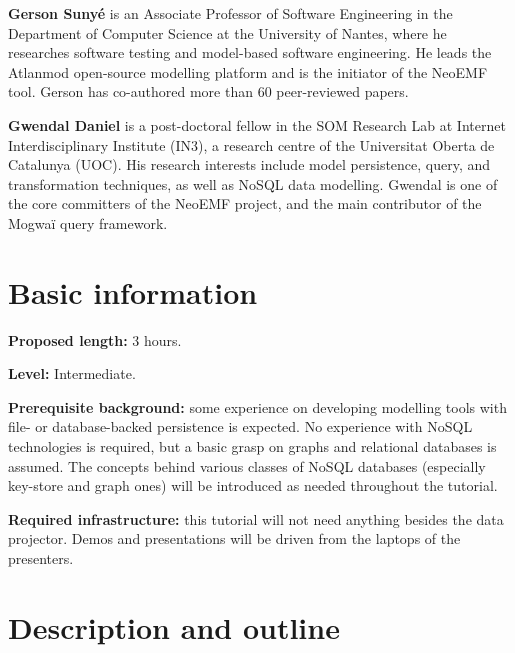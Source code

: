 \documentclass[conference]{IEEEtran}
\newcommand{\todo}[1]{{\color{red}#1}}
\begin{document}
\textbf{Gerson Sunyé} %
is an Associate Professor of Software Engineering in the Department of Computer Science at the University of Nantes, where he researches software testing and model-based software engineering.
He leads the Atlanmod open-source modelling platform and is the initiator of the NeoEMF tool.
Gerson has co-authored more than 60 peer-reviewed papers.

\textbf{Gwendal Daniel} %
is a post-doctoral fellow in the SOM Research Lab at Internet Interdisciplinary Institute (IN3), a research centre of the Universitat Oberta de Catalunya (UOC). His research interests include model persistence, query, and transformation techniques, as well as NoSQL data modelling. Gwendal is one of the core committers of the NeoEMF project, and the main contributor of the Mogwa\"i query framework.


\section{Basic information}

\textbf{Proposed length:} 3 hours.

\textbf{Level:} Intermediate.

\textbf{Prerequisite background:} some experience on developing modelling tools with file- or database-backed persistence is expected. No experience with NoSQL technologies is required, but a basic grasp on graphs and relational databases is assumed. The concepts behind various classes of NoSQL databases (especially key-store and graph ones) will be introduced as needed throughout the tutorial.

\textbf{Required infrastructure:} this tutorial will not need anything besides
the data projector. Demos and presentations will be driven from the laptops of
the presenters.

\section{Description and outline}
\end{document}
